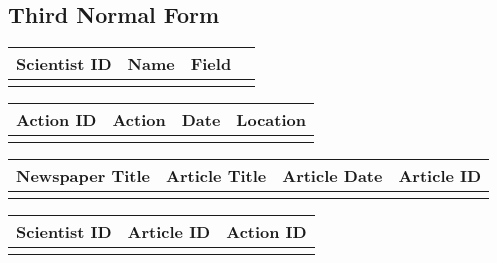 \documentclass[draft]{article}
\begin{document}
\subsection{Third Normal Form}

\begin{table}[H]
\begin{tabular}{|l|l|l|l|}
\hline
Scientist ID & Name & Field  \\ \hline
	& 		& 	 \\ \hline
\end{tabular}
\end{table}

\begin{table}[H]
\begin{tabular}{|l|l|l|l|}
\hline
Action ID & Action & Date & Location \\ \hline
	& 		& 		& \\ \hline
\end{tabular}
\end{table}

\begin{table}[H]
\begin{tabular}{|l|l|l|l|}
\hline
Newspaper Title & Article Title & Article Date & Article ID \\ \hline
                &               &              &            \\ \hline
\end{tabular}
\end{table}

\begin{table}[H]
\begin{tabular}{|l|l|l|}
\hline
Scientist ID & Article ID & Action ID \\ \hline
             &          &  \\ \hline
\end{tabular}
\end{table}
\end{document}
